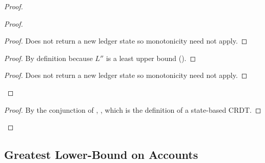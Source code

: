 \documentclass[9pt]{article}   	%
\begin{document}
\begin{proof}
\begin{proof}
		\begin{proof}
			Does not return a new ledger state so monotonicity need not apply.
		\end{proof}
			
		\begin{proof}
		 	By definition because $L''$ is a least upper bound ().
		\end{proof}
			
		\begin{proof}
			Does not return a new ledger state so monotonicity need not apply.
		\end{proof}

	\end{proof}

	
	\qedstep
	\begin{proof}
		By the conjunction of , ,  which is the definition of a state-based CRDT.
	\end{proof}
\end{proof}

\subsection{Greatest Lower-Bound on Accounts}
\label{sec:hlb}
\end{document}
